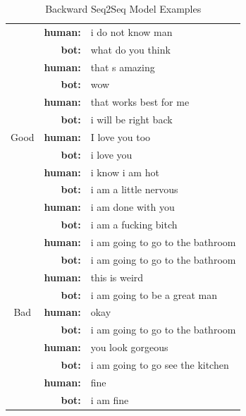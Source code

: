 \documentclass[letterpaper]{article}
\begin{document}
\begin{table}[bt!]
    \centering
    \small
    \caption{\small Backward Seq2Seq Model Examples}
    \begin{tabularx}{0.48\textwidth}{c|rl}
    	\hline
      \hline
        & \textbf{human:} & i do not know man\\
		& \textbf{bot:} & what do you think\\		
& \textbf{human:} & that s amazing \\
& \textbf{bot:} & wow \\
& \textbf{human:} & that works best for me \\
& \textbf{bot:} & i will be right back \\
Good & \textbf{human:} & I love you too \\
& \textbf{bot:} & i love you \\
& \textbf{human:} & i know i am hot \\
& \textbf{bot:} & i am a little nervous \\
& \textbf{human:} & i am done with you \\
& \textbf{bot:} & i am a fucking bitch \\
\hline
& \textbf{human:} & i am going to go to the bathroom\\
& \textbf{bot:} & i am going to go to the bathroom \\
& \textbf{human:} & this is weird \\
& \textbf{bot:} & i am going to be a great man \\
Bad & \textbf{human:} & okay\\
& \textbf{bot:} & i am going to go to the bathroom\\
& \textbf{human:} & you look gorgeous \\
& \textbf{bot:} & i am going to go see the kitchen \\
& \textbf{human:} & fine\\
& \textbf{bot:} & i am fine\\
      \hline
    \end{tabularx}
    \label{table:backward_seq2seq}
\end{table}
\end{document}
